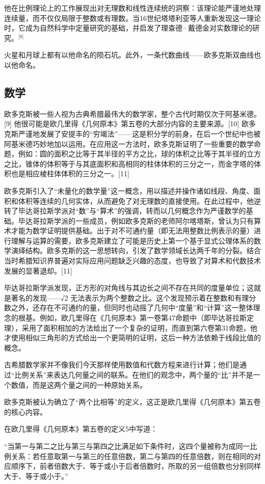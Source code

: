 他在比例理论上的工作展现出对无理数和线性连续统的洞察：该理论能严谨地处理连续量，而不仅仅局限于整数或有理数。当16世纪塔塔利亚等人重新发现这一理论时，它成为自然科学中定量研究的基础，并启发了理查德·戴德金对实数理论的研究。\(^\text{[8]}\)

火星和月球上都有以他命名的陨石坑。此外，一条代数曲线——欧多克斯双曲线也以他命名。
\subsection{数学}
欧多克斯被一些人视为古典希腊最伟大的数学家，整个古代时期仅次于阿基米德。[9] 他很可能是欧几里得《几何原本》第五卷的大部分内容的主要来源。[10] 欧多克斯严谨地发展了安提丰的“穷竭法”——这是积分学的前身，在后一个世纪中也被阿基米德巧妙地加以运用。在应用这一方法时，欧多克斯证明了一些重要的数学命题，例如：圆的面积之比等于其半径的平方之比，球的体积之比等于其半径的立方之比，锥体的体积等于与其底面积和高相同的柱体体积的三分之一，而金字塔的体积也是相应棱柱体体积的三分之一。[11]

欧多克斯引入了“未量化的数学量”这一概念，用以描述并操作诸如线段、角度、面积和体积等连续的几何实体，从而避免了对无理数的直接使用。在此过程中，他逆转了毕达哥拉斯学派对“数”与“算术”的强调，转而以几何概念作为严谨数学的基础。毕达哥拉斯学派的一些成员，例如欧多克斯的老师阿尔喀塔斯，曾认为只有算术才能为数学证明提供基础。出于对不可通约量（即无法用整数比例表示的量）进行理解与运算的需要，欧多克斯建立了可能是历史上第一个基于显式公理体系的数学演绎结构。欧多克斯的这一思想转向，引发了数学领域长达两千年的分裂。结合当时希腊知识界普遍对实际应用问题缺乏兴趣的态度，也导致了对算术和代数技术发展的显著退却。[11]

毕达哥拉斯学派发现，正方形的对角线与其边长之间不存在共同的度量单位；这就是著名的发现——√2 无法表示为两个整数之比。这个发现预示着在整数和有理分数之外，还存在不可通约的量，但同时也动摇了几何中“度量”和“计算”这一整体理念的根基。例如，欧几里得在《几何原本》第一卷第47命题中（即毕达哥拉斯定理），采用了面积相加的方法给出了一个复杂的证明，而直到第六卷第31命题，他才使用相似三角形的方式给出一个更简明的证明，这后一种方法依赖于线段比值的概念。

古希腊数学家并不像我们今天那样使用数值和代数方程来进行计算；他们是通过“比例关系”来表达几何量之间的联系。在他们的观念中，两个量的“比”并不是一个数值，而是这两个量之间的一种原始关系。

欧多克斯被认为确立了“两个比相等”的定义，这正是欧几里得《几何原本》第五卷的核心内容。

在欧几里得《几何原本》第五卷的定义5中写道：

“当第一与第二之比与第三与第四之比满足如下条件时，这四个量被称为成同一比例关系：若任意取第一与第三的任意倍数，第二与第四的任意倍数，则在相同的对应顺序下，前者倍数大于、等于或小于后者倍数时，所取的另一组倍数也分别同样大于、等于或小于。”

